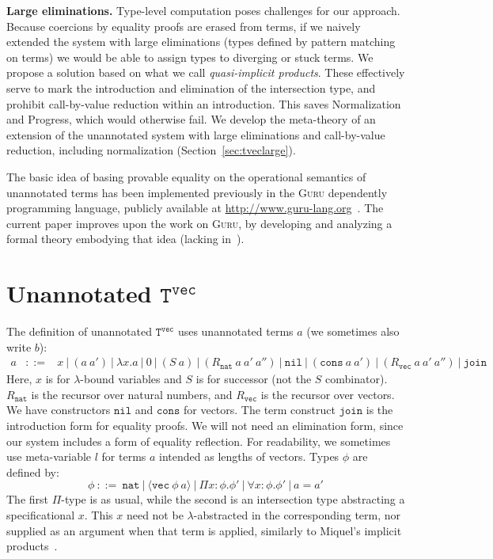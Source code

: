 \documentclass[copyright]{eptcs}
\newcommand{\vc}[0]{\texttt{vec}}
\newcommand{\nat}[0]{\texttt{nat}}
\newcommand{\Tvec}[0]{\texttt{T}^\vc}
\newcommand{\nil}[0]{\texttt{nil}}
\newcommand{\cons}[0]{\texttt{cons}}
\newcommand{\join}[0]{\texttt{join}}
\begin{document}
\textbf{Large eliminations.} Type-level computation poses challenges
for our approach.  Because coercions by equality proofs are erased
from terms, if we naively extended the system with large eliminations
(types defined by pattern matching on terms) we would be able
to assign types to diverging or stuck terms. We propose a solution
based on what we call \emph{quasi-implicit products}.  These
effectively serve to mark the introduction and elimination of the
intersection type, and prohibit call-by-value reduction within an
introduction.  This saves Normalization and Progress, which would
otherwise fail.  We develop the meta-theory of an extension of the
unannotated system with large eliminations and call-by-value
reduction, including normalization (Section~\ref{sec:tveclarge}).

The basic idea of basing provable equality on the operational
semantics of unannotated terms has been implemented previously in the
\textsc{Guru} dependently programming language, publicly available at
\url{http://www.guru-lang.org}~\cite{guru09}.  The current paper
improves upon the work on \textsc{Guru}, by developing and analyzing a
formal theory embodying that idea (lacking in~\cite{guru09}).

\section{Unannotated $\Tvec$}
\label{sec:core}

The definition of unannotated $\Tvec$ uses  unannotated terms $a$ (we
sometimes also write $b$):
\[
\begin{array}{lll}
 a & ::= & x\ |\ (a\ a')\ |\ \lambda x.a\ |\ 0\ |\ (S\ a)\ |\ (R_\nat\ a\ a'\ a'') \ 
|\ \nil\ |\ (\cons\ a\ a')\ |\ (R_\vc\ a\ a'\ a'')\ |\ \join\ 
\end{array}
\]
\noindent Here, $x$ is for $\lambda$-bound variables and $S$ is for
successor (not the $S$ combinator).  $R_\nat$ is the recursor over
natural numbers, and $R_\vc$ is the recursor over vectors.  We have
constructors $\nil$ and $\cons$ for vectors.  The term construct
$\join$ is the introduction form for equality proofs.  We will not
need an elimination form, since our system includes a form of equality
reflection.  For readability, we sometimes use meta-variable $l$ for
terms $a$ intended as lengths of vectors.  Types $\phi$ are defined
by:
\[
 \phi\ ::=\ \nat\ |\ \langle \vc\ \phi\ a\rangle\ |\ \Pi x:\phi.\phi'\ |\ \forall x:\phi.\phi'\ |\ a = a' 
\]
\noindent The first $\Pi$-type is as usual, while the second is an
intersection type abstracting a specificational $x$.  This $x$ need
not be $\lambda$-abstracted in the corresponding term, nor supplied as
an argument when that term is applied, similarly to Miquel's implicit
products~\cite{miquel01}. 
\end{document}
